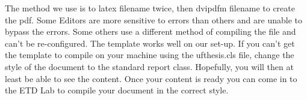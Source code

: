 The method we use is to latex filename twice, then dvipdfm filename to create the pdf. Some Editors are more sensitive to errors than others and are unable to bypass the errors. Some others use a different method of compiling the file and can't be re-configured. The template works well on our set-up. If you can't get the template to compile on your machine using the ufthesis.cls file, change the style of the document to the standard report class. Hopefully, you will then at least be able to see the content. Once your content is ready you can come in to the ETD Lab to compile your document in the correct style. 